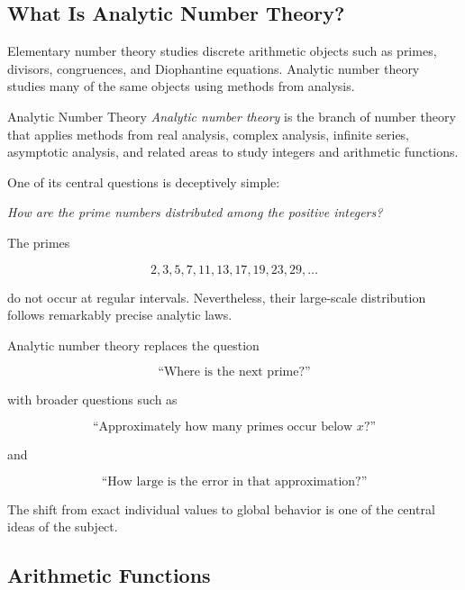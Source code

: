 \subsection{What Is Analytic Number Theory?}
\label{subsec:what-is-analytic-number-theory}

Elementary number theory studies discrete arithmetic objects such as primes,
divisors, congruences, and Diophantine equations. Analytic number theory
studies many of the same objects using methods from analysis.

\begin{definitionbox}{Analytic Number Theory}
\emph{Analytic number theory} is the branch of number theory that applies
methods from real analysis, complex analysis, infinite series, asymptotic
analysis, and related areas to study integers and arithmetic functions.
\end{definitionbox}

One of its central questions is deceptively simple:

\begin{center}
\emph{How are the prime numbers distributed among the positive integers?}
\end{center}

The primes

\[ 2,3,5,7,11,13,17,19,23,29,\ldots \]

do not occur at regular intervals. Nevertheless, their large-scale
distribution follows remarkably precise analytic laws.

\begin{conceptbox}
Analytic number theory replaces the question

\[
\text{``Where is the next prime?''}
\]

with broader questions such as

\[
\text{``Approximately how many primes occur below }x\text{?''}
\]

and

\[
\text{``How large is the error in that approximation?''}
\]

The shift from exact individual values to global behavior is one of the
central ideas of the subject.
\end{conceptbox}

\subsection{Arithmetic Functions}
\label{subsec:analytic-arithmetic-functions}

